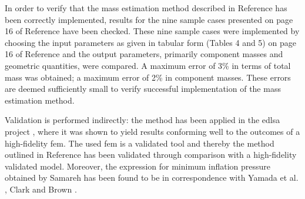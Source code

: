In order to verify that the mass estimation method described in Reference \cite{Samareh2011} has been correctly implemented, results for the nine sample cases presented on page 16 of Reference \cite{Samareh2011} have been checked. These nine sample cases were implemented by choosing the input parameters as given in tabular form (Tables 4 and 5) on page 16 of Reference \cite{Samareh2011} and the output parameters, primarily component masses and geometric quantities, were compared. A maximum error of 3\% in terms of total mass was obtained; a maximum error of 2\% in component masses. These errors are deemed sufficiently small to verify successful implementation of the mass estimation method.

Validation is performed indirectly: the method \cite{Samareh2011} has been applied in the \gls{edlsa} project \cite{Cianciolo2010}, where it was shown to yield results conforming well to the outcomes of a high-fidelity \gls{fem}. The used \gls{fem} is a validated tool \cite{Cianciolo2010} and thereby the method outlined in Reference \cite{Samareh2011} has been validated through comparison with a high-fidelity validated model. Moreover, the expression for minimum inflation pressure obtained by Samareh has been found to be in correspondence with Yamada et al. \cite{Yamada2009}, Clark \cite{Clark2009} and Brown \cite{Brown2009}.



